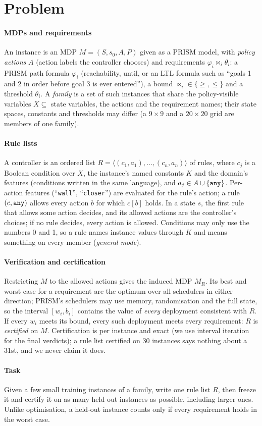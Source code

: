 \section{Problem}\label{sec:background}

\paragraph*{MDPs and requirements}
An instance is an MDP $M = (S, s_0, A, P)$ given as a PRISM model, with \emph{policy actions} $A$ (action labels the
controller chooses) and requirements $\varphi_i \bowtie_i \theta_i$: a PRISM path formula $\varphi_i$ (reachability,
until, or an LTL formula such as ``goals 1 and 2 in order before goal 3 is ever entered''), a bound
${\bowtie_i} \in \{\geq, \leq\}$ and a threshold $\theta_i$. A \emph{family} is a set of such instances that share
the policy-visible variables $X \subseteq$ state variables, the actions and the requirement names; their state spaces,
constants and thresholds may differ (a $9\times 9$ and a $20\times 20$ grid are members of one family).

\paragraph*{Rule lists}
A controller is an ordered list $R = \langle (c_1, a_1), \dots, (c_n, a_n) \rangle$ of rules, where $c_j$ is a
Boolean condition over $X$, the instance's named constants $K$ and the domain's features (conditions written in the
same language), and $a_j \in A \cup \{\texttt{any}\}$. Per-action features (``\texttt{wall}'', ``\texttt{closer}'') are
evaluated for the rule's action; a rule $(c, \texttt{any})$ allows every action $b$ for which $c[b]$ holds. In a state $s$,
the first rule that allows some action decides, and its allowed actions are the controller's choices; if no rule
decides, every action is allowed. Conditions may only use the numbers 0 and 1, so a rule names instance values
through $K$ and means something on every member (\emph{general mode}).

\paragraph*{Verification and certification}
Restricting $M$ to the allowed actions gives the induced MDP $M_R$. Its best and worst case for a requirement are the
optimum over all schedulers in either direction; PRISM's schedulers may use memory, randomisation and the full state,
so the interval $[w_i, b_i]$ contains the value of \emph{every} deployment consistent with $R$. If every $w_i$ meets
its bound, every such deployment meets every requirement: $R$ is \emph{certified} on $M$. Certification is per
instance and exact (we use interval iteration for the final verdicts); a rule list certified on 30 instances says
nothing about a 31st, and we never claim it does.

\paragraph*{Task}
Given a few small training instances of a family, write one rule list $R$, then freeze it and certify it on as many
held-out instances as possible, including larger ones. Unlike optimisation, a held-out instance counts only if every
requirement holds in the worst case.
